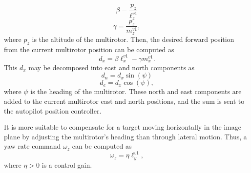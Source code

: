 \begin{equation}
\beta=\frac{p_z}{\ell^{v1}_z}
\end{equation} 
\begin{equation}
\gamma=\frac{p_z}{m^{v1}_z},
\end{equation} where $p_z$ is the altitude of the multirotor. Then, the desired forward position from the current multirotor position can be computed as 
\begin{equation}
d_x=\beta\ell^{v1}_x-\gamma{m}^{v1}_x.
\end{equation}
This $d_x$ may be decomposed into east and north components as
\begin{equation}
d_n=d_x\sin(\psi)
\end{equation}
\begin{equation}
d_e=d_x\cos(\psi),
\end{equation} where $\psi$ is the heading of the multirotor. These north and east components are added to the current multirotor east and north positions, and the sum is sent to the autopilot position controller.

It is more suitable to compensate for a target moving horizontally in the image plane by adjusting the multirotor's heading than through lateral motion. Thus, a yaw rate command $\omega_z$ can be computed as 
\begin{equation}
\omega_z=\eta \ell^{v1}_y,
\end{equation} where $\eta>0$ is a control gain.

